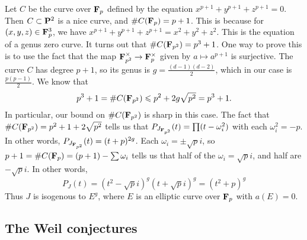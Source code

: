 \begin{example}
Let $C$ be the curve over $\mathbf{F}_p$ defined by the equation 
$x^{p+1}+y^{p+1}+z^{p+1}=0$. Then $C\subset \mathbf{P}^2$ is a nice curve, and 
$\# C(\mathbf{F}_p)=p+1$. This is because for $(x,y,z)\in \mathbf{F}_p^3$, we have 
$x^{p+1}+y^{p+1}+z^{p+1}=x^2+y^2+z^2$. This is the equation of a genus zero 
curve. It turns out that $\# C(\mathbf{F}_{p^2}) = p^3+1$. One way to prove this is 
to use the fact that the map $\mathbf{F}_{p^2}^\times \to \mathbf{F}_p^\times$ given by 
$a\mapsto a^{p+1}$ is surjective. The curve $C$ has degree 
$p+1$, so its genus is $g=\frac{(d-1)(d-2)}{2}$, which in our case is 
$\frac{p(p-1)}{2}$. We know that 
\[
  p^3+1 = \# C(\mathbf{F}_{p^2}) \leqslant p^2+2 g\sqrt{p^2} = p^3+1 \text{.}
\]
In particular, our bound on $\# C(\mathbf{F}_{p^2})$ is sharp in this case. The fact 
that $\# C(\mathbf{F}_{p^2}) = p^2+1+2\sqrt{p^2}$ tells us that 
$P_{J_{\mathbf{F}_{p^2}}}(t) = \prod (t-\omega_i^2)$ with each $\omega_i^2=-p$. In 
other words, $P_{J_{\mathbf{F}_{p^2}}}(t) = (t+p)^{2g}$. Each 
$\omega_i = \pm \sqrt p i$, so $p+1=\# C(\mathbf{F}_p) = (p+1) - \sum \omega_i$ 
tells us that half of the $\omega_i=\sqrt p i$, and half are 
$-\sqrt p i$. In other words, 
\[
  P_J(t) = (t^2-\sqrt p i)^g (t+\sqrt p i)^g = (t^2+p)^g
\]
Thus $J$ is isogenous to $E^g$, where $E$ is an elliptic curve over $\mathbf{F}_p$ 
with $a(E)=0$. 
\end{example}










\subsection{The Weil conjectures}

